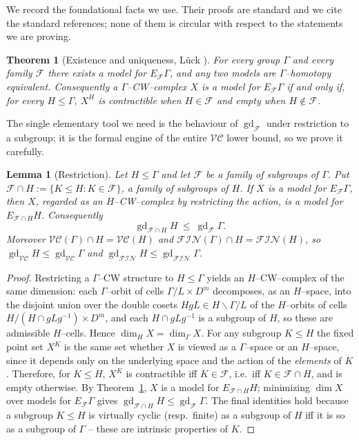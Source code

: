 \documentclass{amsart}
\newtheorem{theorem}{Theorem}
\newtheorem{lemma}{Lemma}
\theoremstyle{definition}
\newcommand{\FIN}{\mathcal{F\!I\!N}}
\newcommand{\VC}{\mathcal{V\!C}}
\newcommand{\gd}{\operatorname{gd}}
\begin{document}
We record the foundational facts we use. Their proofs are standard and we cite the standard
references; none of them is circular with respect to the statements we are proving.

\begin{theorem}[Existence and uniqueness, {Lück \cite[\S1--2]{LueckSurvey}}]\label{thm:exist}
For every group $\Gamma$ and every family $\mathcal F$ there exists a model for
$E_{\mathcal F}\Gamma$, and any two models are $\Gamma$--homotopy equivalent. Consequently a
$\Gamma$--CW--complex $X$ is a model for $E_{\mathcal F}\Gamma$ if and only if, for every
$H\le\Gamma$, $X^{H}$ is contractible when $H\in\mathcal F$ and empty when
$H\notin\mathcal F$.
\end{theorem}

The single elementary tool we need is the behaviour of $\gd_{\mathcal F}$ under restriction to a
subgroup; it is the formal engine of the entire $\VC$ lower bound, so we prove it carefully.

\begin{lemma}[Restriction]\label{lem:restrict}
Let $H\le\Gamma$ and let $\mathcal F$ be a family of subgroups of $\Gamma$. Put
$\mathcal F\cap H:=\{K\le H : K\in\mathcal F\}$, a family of subgroups of $H$. If $X$ is a model
for $E_{\mathcal F}\Gamma$, then $X$, regarded as an $H$--CW--complex by restricting the action,
is a model for $E_{\mathcal F\cap H}H$. Consequently
\[
\gd_{\mathcal F\cap H} H\ \le\ \gd_{\mathcal F}\Gamma .
\]
Moreover $\VC(\Gamma)\cap H=\VC(H)$ and $\FIN(\Gamma)\cap H=\FIN(H)$, so
$\gd_{\VC}H\le\gd_{\VC}\Gamma$ and $\gd_{\FIN}H\le\gd_{\FIN}\Gamma$.
\end{lemma}

\begin{proof}
Restricting a $\Gamma$--CW structure to $H\le\Gamma$ yields an $H$--CW--complex of the same
dimension: each $\Gamma$--orbit of cells $\Gamma/L\times D^{m}$ decomposes, as an
$H$--space, into the disjoint union over the double cosets $HgL\in H\backslash \Gamma/L$ of the
$H$--orbits of cells $H/(H\cap gLg^{-1})\times D^{m}$, and each $H\cap gLg^{-1}$ is a subgroup
of $H$, so these are admissible $H$--cells. Hence $\dim_H X=\dim_\Gamma X$. For any subgroup
$K\le H$ the fixed point set $X^{K}$ is the same set whether $X$ is viewed as a $\Gamma$--space
or an $H$--space, since it depends only on the underlying space and the action of the
\emph{elements} of $K$. Therefore, for $K\le H$, $X^{K}$ is contractible iff $K\in\mathcal F$,
i.e.\ iff $K\in\mathcal F\cap H$, and is empty otherwise. By Theorem~\ref{thm:exist}, $X$ is a
model for $E_{\mathcal F\cap H}H$; minimizing $\dim X$ over models for $E_{\mathcal F}\Gamma$
gives $\gd_{\mathcal F\cap H}H\le\gd_{\mathcal F}\Gamma$. The final identities hold because a
subgroup $K\le H$ is virtually cyclic (resp.\ finite) as a subgroup of $H$ iff it is so as a
subgroup of $\Gamma$ -- these are intrinsic properties of $K$.
\end{proof}
\end{document}
